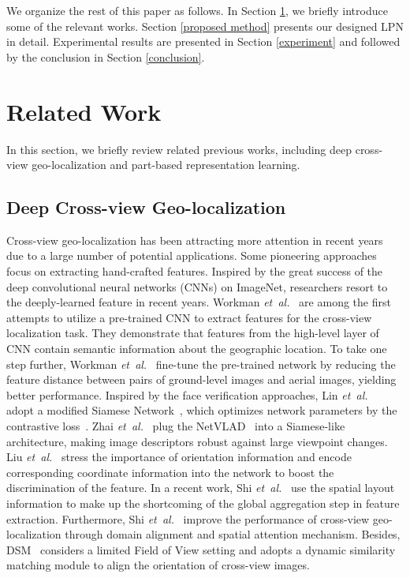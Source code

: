 \documentclass[journal]{IEEEtran}
\def\etal{\emph{et~al.}}
\begin{document}
\par
We organize the rest of this paper as follows. In Section \ref{related_work}, we briefly introduce some of the relevant works. Section \ref{proposed method} presents our designed LPN in detail. Experimental results are presented in Section \ref{experiment} and followed by the conclusion in Section \ref{conclusion}.

\section{Related Work}\label{related_work}
In this section, we briefly review related previous works, including deep cross-view geo-localization and part-based representation learning.

\subsection{Deep Cross-view Geo-localization}
Cross-view geo-localization has been attracting more attention in recent years due to a large number of potential applications. Some pioneering approaches~\cite{SemanticCM,lin2013cross,senlet2011framework,bansal2011geo} focus on extracting hand-crafted features. Inspired by the great success of the deep convolutional neural networks (CNNs) on ImageNet, researchers resort to the deeply-learned feature in recent years. 
Workman \etal~\cite{workman_location_2015} are among the first attempts to utilize a pre-trained CNN to extract features for the cross-view localization task. They demonstrate that features from the high-level layer of CNN contain semantic information about the geographic location. To take one step further, Workman \etal ~\cite{workman_wide-area_2015} fine-tune the pre-trained network by reducing the feature distance between pairs of ground-level images and aerial images, yielding better performance. 
Inspired by the face verification approaches, Lin \etal~\cite{lin_learning_2015} adopt a modified Siamese Network~\cite{chopra2005learning}, which optimizes network parameters by the contrastive loss~\cite{hadsell2006dimensionality,deng2018image}. 
Zhai \etal~\cite{hu_cvm-net_2018} plug the NetVLAD~\cite{arandjelovic2016netvlad} into a Siamese-like architecture, making image descriptors robust against large viewpoint changes. 
Liu \etal~\cite{liu_lending_2019} stress the importance of orientation information and encode corresponding coordinate information into the network to boost the discrimination of the feature. 
In a recent work, Shi \etal~\cite{shi_optimal_nodate} use the spatial layout information to make up the shortcoming of the global aggregation step in feature extraction. Furthermore, Shi \etal~\cite{shi_spatial-aware_nodate} improve the performance of cross-view geo-localization through domain alignment and spatial attention mechanism. Besides, DSM~\cite{Shi_2020_CVPR} considers a limited Field of View setting and adopts a dynamic similarity matching module to align the orientation of cross-view images. 
\end{document}
